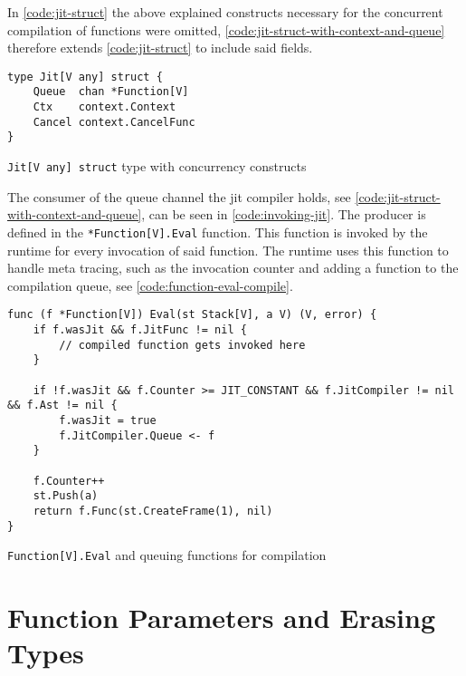 In \autoref{code:jit-struct} the above explained constructs necessary for the
concurrent compilation of functions were omitted,
\autoref{code:jit-struct-with-context-and-queue} therefore extends
\autoref{code:jit-struct} to include said fields.

\begin{listing}[H]
    \begin{verbatim}
type Jit[V any] struct {
	Queue  chan *Function[V]
	Ctx    context.Context
	Cancel context.CancelFunc
}
    \end{verbatim}
    \caption{\texttt{Jit[V any] struct} type with concurrency constructs}
    \label{code:jit-struct-with-context-and-queue}
\end{listing}

The consumer of the queue channel the jit compiler holds, see
\autoref{code:jit-struct-with-context-and-queue}, can be seen in
\autoref{code:invoking-jit}. The producer is defined in the
\texttt{*Function[V].Eval} function. This function is invoked by the runtime
for every invocation of said function. The runtime uses this function to handle
meta tracing, such as the invocation counter and adding a function to the
compilation queue, see \autoref{code:function-eval-compile}.

\begin{listing}[H]
    \begin{verbatim}
func (f *Function[V]) Eval(st Stack[V], a V) (V, error) {
    if f.wasJit && f.JitFunc != nil {
        // compiled function gets invoked here
    }

    if !f.wasJit && f.Counter >= JIT_CONSTANT && f.JitCompiler != nil && f.Ast != nil {
        f.wasJit = true
        f.JitCompiler.Queue <- f
    }

    f.Counter++
    st.Push(a)
    return f.Func(st.CreateFrame(1), nil)
}

    \end{verbatim}
    \caption{\texttt{Function[V].Eval} and queuing functions for compilation}
    \label{code:function-eval-compile}
\end{listing}

\section{Function Parameters and Erasing Types}

